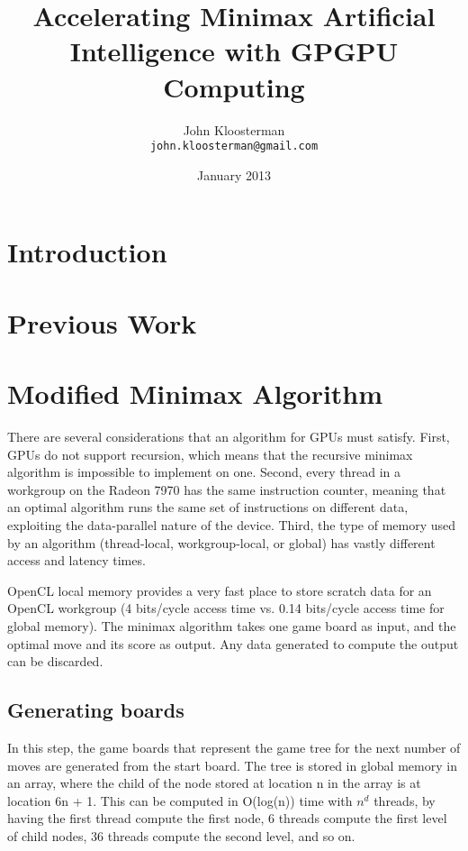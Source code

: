 \documentclass{article}
\begin{document}
\title{Accelerating Minimax Artificial Intelligence with GPGPU Computing}
\author{John Kloosterman \\
  \texttt{john.kloosterman@gmail.com}}
\date{January 2013}
\maketitle

\section{Introduction}

\section{Previous Work}

\section{Modified Minimax Algorithm}
There are several considerations that an algorithm for GPUs must satisfy. First, GPUs do not support recursion, which means that the recursive minimax algorithm is impossible to implement on one. Second, every thread in a workgroup on the Radeon 7970 has the same instruction counter, meaning that an optimal algorithm runs the same set of instructions on different data, exploiting the data-parallel nature of the device. Third, the type of memory used by an algorithm (thread-local, workgroup-local, or global) has vastly different access and latency times.

OpenCL local memory provides a very fast place to store scratch data for an OpenCL workgroup (4 bits/cycle access time vs. 0.14 bits/cycle access time for global memory). The minimax algorithm takes one game board as input, and the optimal move and its score as output. Any data generated to compute the output can be discarded.

\subsection{Generating boards}
In this step, the game boards that represent the game tree for the next number of moves are generated from the start board. The tree is stored in global memory in an array, where the child of the node stored at location n in the array is at location 6n + 1. This can be computed in O(log(n)) time with $n^{d}$ threads, by having the first thread compute the first node, 6 threads compute the first level of child nodes, 36 threads compute the second level, and so on.
\end{document}
